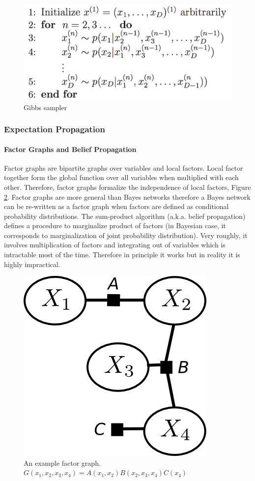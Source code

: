 \documentclass[12pt]{article}
\begin{document}
\begin{figure}[!ht]
	\centering
	\includegraphics[width=0.55\columnwidth]{gibbs}	
	\caption{Gibbs sampler}
	\label{gibbs}
\end{figure}


\subsubsection{Expectation Propagation}
\paragraph{Factor Graphs and Belief Propagation}
Factor graphs are bipartite graphs over variables and local factors. Local factor together form the global function over all variables when multiplied with each other. Therefore, factor graphs formalize the independence of local factors, Figure \ref{fg}. Factor graphs are more general than Bayes networks therefore a Bayes network can be re-written as a factor graph when factors are defined as conditional probability distributions. The sum-product algorithm \cite{loeliger2001factor} (a.k.a. belief propagation) defines a procedure to marginalize product of factors (in Bayesian case, it corresponds to marginalization of joint probability distribution). Very roughly, it involves multiplication of factors and integrating out of variables which is intractable most of the time. Therefore in principle it works but in reality it is highly impractical.
\begin{figure}[!ht]
	\centering
	\includegraphics[width=0.3\columnwidth]{fg}	
	\caption{An example factor graph. $G(x_1, x_2, x_3, x_4) = A(x_1, x_2) B(x_2, x_3, x_4) C(x_4)$}
	\label{fg}
\end{figure}
\end{document}

